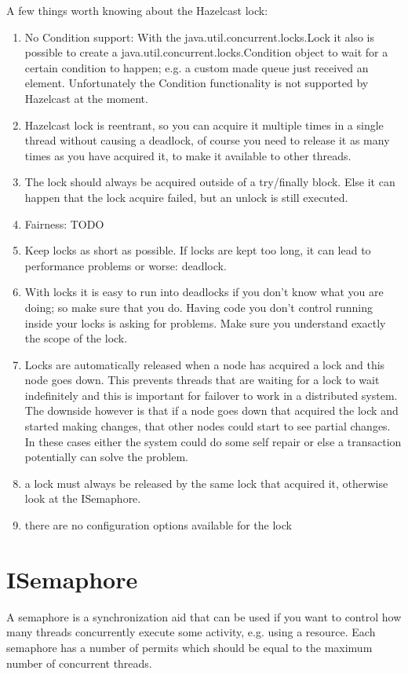 A few things worth knowing about the Hazelcast lock:
\begin{enumerate}
\item No Condition support: With the java.util.concurrent.locks.Lock it also is possible to create a java.util.concurrent.locks.Condition object to wait for a certain condition to happen; e.g. a custom made queue just received an element. Unfortunately the Condition functionality is not supported by Hazelcast at the moment.
\item Hazelcast lock is reentrant, so you can acquire it multiple times in a single thread without causing a deadlock, of course you need to release it as many times as you have acquired it, to make it available to other threads.
\item The lock should always be acquired outside of a try/finally block. Else it can happen that the lock acquire failed, but an unlock is still executed.
\item Fairness: TODO
\item Keep locks as short as possible. If locks are kept too long, it can lead to performance problems or worse: deadlock.
\item With locks it is easy to run into deadlocks if you don't know what you are doing; so make sure that you do. Having code you don't control running inside your locks is asking for problems. Make sure you understand exactly the scope of the lock.
\item Locks are automatically released when a node has acquired a lock and this node goes down. This prevents threads that are waiting for a lock to wait indefinitely and this is important for failover to work in a distributed system. The downside however is that if a node goes down that acquired the lock and started making changes, that other nodes could start to see partial changes. In these cases either the system could do some self repair or else a transaction potentially can solve the problem.
\item a lock must always be released by the same lock that acquired it, otherwise look at the ISemaphore.
\item there are no configuration options available for the lock
\end{enumerate}

\section{ISemaphore}

A semaphore is a synchronization aid that can be used if you want to control how many threads concurrently execute some activity, e.g. using a resource. Each semaphore has a number of permits which should be equal to the maximum number of concurrent threads. 

